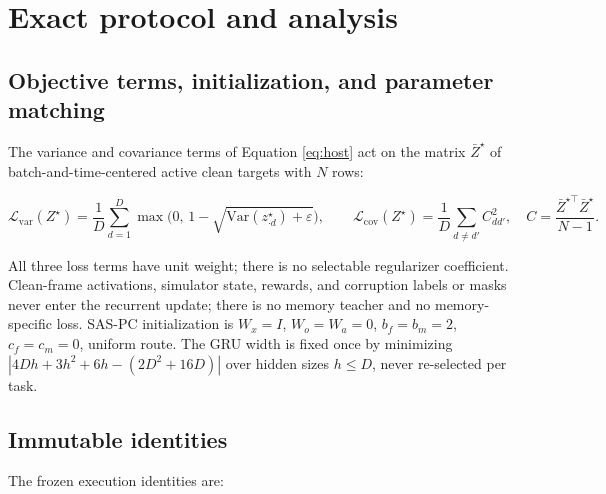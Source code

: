 \appendix
\section{Exact protocol and analysis}\label{exact-protocol-and-analysis}

\subsection{Objective terms, initialization, and parameter
matching}\label{objective-terms-initialization-and-parameter-matching}

The variance and covariance terms of Equation \ref{eq:host} act on the
matrix \(\bar Z^\star\) of batch-and-time-centered active clean targets
with \(N\) rows:

\begin{equation}\mathcal L_{\mathrm{var}}(Z^\star)=\frac1D\sum_{d=1}^{D}\max\!\big(0,\,1-\sqrt{\mathrm{Var}(z^\star_{\cdot d})+\varepsilon}\big),\qquad
\mathcal L_{\mathrm{cov}}(Z^\star)=\frac1D\sum_{d\ne d'}C_{dd'}^2,\quad C=\frac{\bar Z^{\star\top}\bar Z^\star}{N-1}.
\label{eq:vicreg}\end{equation}

All three loss terms have unit weight; there is no selectable
regularizer coefficient. Clean-frame activations, simulator state,
rewards, and corruption labels or masks never enter the recurrent
update; there is no memory teacher and no memory-specific loss. SAS-PC
initialization is \(W_x=I\), \(W_o=W_a=0\), \(b_f=b_m=2\),
\(c_f=c_m=0\), uniform route. The GRU width is fixed once by minimizing
\(|4Dh+3h^2+6h-(2D^2+16D)|\) over hidden sizes \(h\le D\), never re-selected per
task.

\subsection{Immutable identities}\label{immutable-identities}

The frozen execution identities are:

